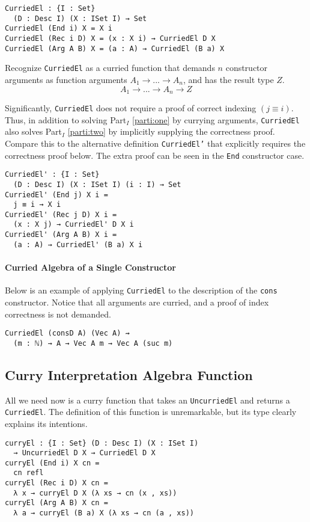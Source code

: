 \documentclass[nonatbib]{sigplanconf}
\newcommand{\refparti}[1]{Part$_I$ \ref{parti:#1}}
\begin{document}
\begin{verbatim}
CurriedEl : {I : Set}
  (D : Desc I) (X : ISet I) → Set
CurriedEl (End i) X = X i
CurriedEl (Rec i D) X = (x : X i) → CurriedEl D X
CurriedEl (Arg A B) X = (a : A) → CurriedEl (B a) X
\end{verbatim}

Recognize {\tt CurriedEl} as a curried function that demands
$n$ constructor arguments as function arguments
$A_1 → ... → A_n$, and has the result type $Z$.
\[
A_1 → ... → A_n → Z
\]

Significantly, {\tt CurriedEl} does not require a proof of correct
indexing $(j≡i)$. Thus, in addition to solving \refparti{one} by
currying arguments, {\tt CurriedEl} also solves \refparti{two} by
implicitly supplying the correctness proof. Compare this to the
alternative definition {\tt CurriedEl'} that explicitly requires the
correctness proof below. The extra proof can be seen in the
{\tt End} constructor case.

\begin{verbatim}
CurriedEl' : {I : Set}
  (D : Desc I) (X : ISet I) (i : I) → Set
CurriedEl' (End j) X i =
  j ≡ i → X i
CurriedEl' (Rec j D) X i =
  (x : X j) → CurriedEl' D X i
CurriedEl' (Arg A B) X i =
  (a : A) → CurriedEl' (B a) X i
\end{verbatim}

\paragraph{Curried Algebra of a Single Constructor}

Below is an example of applying {\tt CurriedEl} to the
description of the {\tt cons} constructor. Notice that all arguments
are curried, and a proof of index correctness is not demanded.

\begin{verbatim}
CurriedEl (consD A) (Vec A) ⇝
  (m : ℕ) → A → Vec A m → Vec A (suc m)
\end{verbatim}

\subsection{Curry Interpretation Algebra Function}

All we need now is a curry function that takes an
{\tt UncurriedEl} and returns a {\tt CurriedEl}. The definition of
this function is unremarkable, but its type clearly explains its
intentions.

\begin{verbatim}
curryEl : {I : Set} (D : Desc I) (X : ISet I)
  → UncurriedEl D X → CurriedEl D X
curryEl (End i) X cn =
  cn refl
curryEl (Rec i D) X cn =
  λ x → curryEl D X (λ xs → cn (x , xs))
curryEl (Arg A B) X cn =
  λ a → curryEl (B a) X (λ xs → cn (a , xs))
\end{verbatim}
\end{document}
